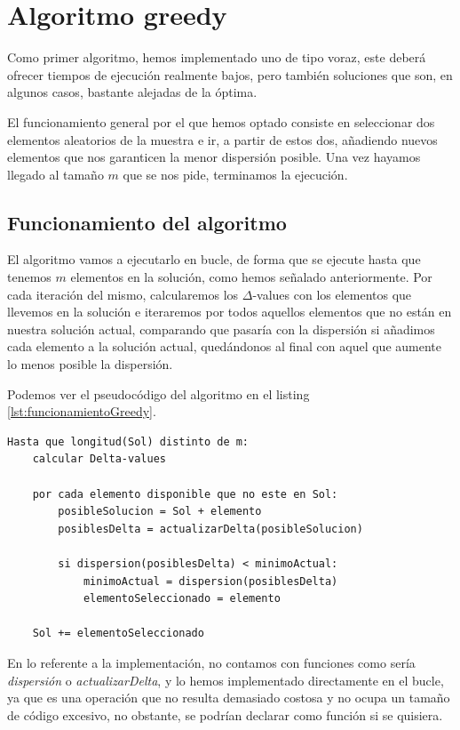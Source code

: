 \newpage

\section{Algoritmo greedy}

Como primer algoritmo, hemos implementado uno de tipo voraz, este deberá ofrecer tiempos de ejecución realmente bajos, pero también soluciones que son, en algunos casos, bastante alejadas de la óptima.

El funcionamiento general por el que hemos optado consiste en seleccionar dos elementos aleatorios de la muestra e ir, a partir de estos dos, añadiendo nuevos elementos que nos garanticen la menor dispersión posible.
Una vez hayamos llegado al tamaño $m$ que se nos pide, terminamos la ejecución.

\subsection{Funcionamiento del algoritmo}

El algoritmo vamos a ejecutarlo en bucle, de forma que se ejecute hasta que tenemos $m$ elementos en la solución, como hemos señalado anteriormente. Por cada iteración del mismo, calcularemos los $\Delta$-values con los elementos que llevemos en la solución e iteraremos por todos aquellos elementos que no están en nuestra solución actual, comparando que pasaría con la dispersión si añadimos cada elemento a la solución actual, quedándonos al final con aquel que aumente lo menos posible la dispersión.

Podemos ver el pseudocódigo del algoritmo en el listing \ref{lst:funcionamientoGreedy}.

\begin{lstlisting}[frame=single, caption={Funcionamiento del algoritmo greedy}, captionpos=b, label=lst:funcionamientoGreedy]
Hasta que longitud(Sol) distinto de m:
    calcular Delta-values
    
    por cada elemento disponible que no este en Sol:
        posibleSolucion = Sol + elemento
        posiblesDelta = actualizarDelta(posibleSolucion)
        
        si dispersion(posiblesDelta) < minimoActual:
            minimoActual = dispersion(posiblesDelta)
            elementoSeleccionado = elemento
    
    Sol += elementoSeleccionado
\end{lstlisting}

En lo referente a la implementación, no contamos con funciones como sería \textit{dispersión} o \textit{actualizarDelta}, y lo hemos implementado directamente en el bucle, ya que es una operación que no resulta demasiado costosa y no ocupa un tamaño de código excesivo, no obstante, se podrían declarar como función si se quisiera.

